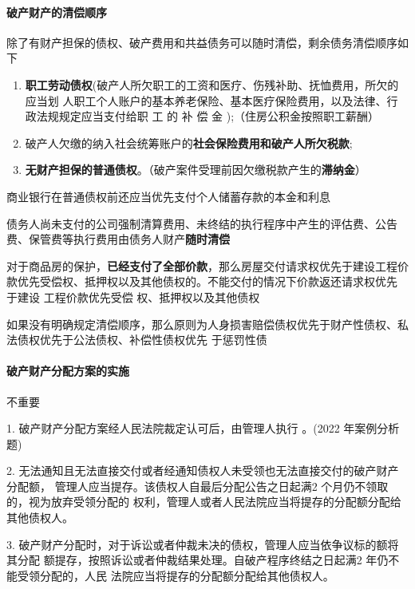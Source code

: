 \documentclass[UTF8,12pt]{ctexart}
\numberwithin{equation}{section} %
\numberwithin{figure}{section}
\numberwithin{table}{section}
\begin{document}
	\paragraph{破产财产的清偿顺序}
	除了有财产担保的债权、破产费用和共益债务可以随时清偿，剩余债务清偿顺序如下
	\begin{enumerate}
		\item \textbf{职工劳动债权}(破产人所欠职工的工资和医疗、伤残补助、抚恤费用，所欠的应当划 人职工个人账户的基本养老保险、基本医疗保险费用，以及法律、行政法规规定应当支付给职 工 的 补 偿 金 );（住房公积金按照职工薪酬）
		
		\item 破产人欠缴的纳入社会统筹账户的\textbf{社会保险费用和破产人所欠税款};
		
		\item \textbf{无财产担保的普通债权}。（破产案件受理前因欠缴税款产生的\textbf{滞纳金}）
	\end{enumerate}
	
	商业银行在普通债权前还应当优先支付个人储蓄存款的本金和利息
	
	债务人尚未支付的公司强制清算费用、未终结的执行程序中产生的评估费、公告费、保管费等执行费用由债务人财产\textbf{随时清偿}
	
	对于商品房的保护，\textbf{已经支付了全部价款}，那么房屋交付请求权优先于建设工程价款优先受偿权、抵押权以及其他债权的。不能交付的情况下价款返还请求权优先 于建设 工程价款优先受偿 权、抵押权以及其他债权
	
	如果没有明确规定清偿顺序，那么原则为人身损害赔偿债权优先于财产性债权、私法债权优先于公法债权、补偿性债权优先 于惩罚性债
	

	
	\paragraph{破产财产分配方案的实施}
	不重要
	
	1. 破产财产分配方案经人民法院裁定认可后，由管理人执行 。(2022 年案例分析题)
	
	2. 无法通知且无法直接交付或者经通知债权人未受领也无法直接交付的破产财产分配额， 管理人应当提存。该债权人自最后分配公告之日起满2 个月仍不领取的，视为放弃受领分配的 权利，管理人或者人民法院应当将提存的分配额分配给其他债权人。
	
	3. 破产财产分配时，对于诉讼或者仲裁未决的债权，管理人应当依争议标的额将其分配 额提存，按照诉讼或者仲裁结果处理。自破产程序终结之日起满2 年仍不能受领分配的，人民 法院应当将提存的分配额分配给其他债权人。
	
\end{document}
